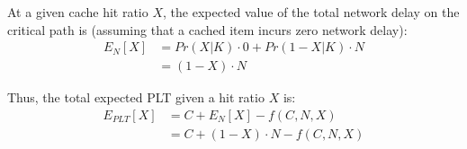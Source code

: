 At a given cache hit ratio $X$, the expected value of the total network delay
on the critical path is (assuming that a cached item incurs zero network delay):
\begin{align*}
E_N[X] & = Pr(X|K) \cdot 0 + Pr(1-X|K) \cdot N \\
& = (1 - X) \cdot N
\end{align*}

Thus, the total expected PLT given a hit ratio $X$ is:
\begin{align*}
E_{PLT}[X] & = C + E_N[X] - f(C,N,X) \\
& = C + (1 - X) \cdot N - f(C,N,X)
\end{align*}

